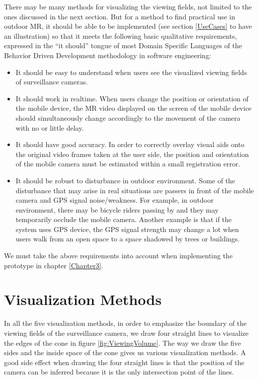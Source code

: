 There may be many methods for visualizing the viewing fields, not limited to the ones discussed in the next section. But for a method to find practical use in outdoor MR, it should be able to be implemented (see section \ref{UseCases} to have an illustration) so that it meets the following basic qualitative requirements, expressed in the ``it should'' tongue of most Domain Specific Languages of the Behavior Driven Development methodology in software engineering:

\begin{itemize}
	\item It should be easy to understand when users see the visualized viewing fields of surveillance cameras.
	\item It should work in realtime. When users change the position or orientation of the mobile device, the MR video displayed on the screen of the mobile device should simultaneously change accordingly to the movement of the camera with no or little delay.
	\item It should have good accuracy. In order to correctly overlay visual aids onto the original video frames taken at the user side, the position and orientation of the mobile camera must be estimated within a small registration error.
	\item It should be robust to disturbance in outdoor environment. Some of the disturbance that may arise in real situations are passers in front of the mobile camera and GPS signal noise/weakness. For example, in outdoor environment, there may be bicycle riders passing by and they may temporarily occlude the mobile camera. Another example is that if the system uses GPS device, the GPS signal strength may change a lot when users walk from an open space to a space shadowed by trees or buildings.
\end{itemize}

We must take the above requirements into account when implementing the prototype in chapter \ref{Chapter3}.


\section{Visualization Methods}
\label{VisualizationMethods}

In all the five visualization methods, in order to emphasize the boundary of the viewing fields of the surveillance camera, we draw four straight lines to visualize the edges of the cone in figure \ref{fig:ViewingVolume}. The way we draw the five sides and the inside space of the cone gives us various visualization methods. A good side effect when drawing the four straight lines is that the position of the camera can be inferred because it is the only intersection point of the lines.

